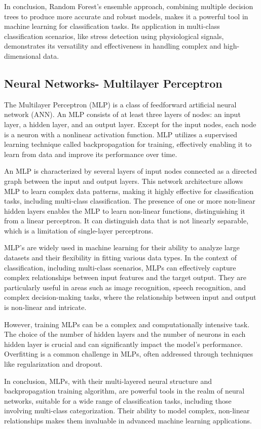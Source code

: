 In conclusion, Random Forest's ensemble approach, combining multiple decision trees to produce more accurate and robust models, makes it a powerful tool in machine learning for classification tasks. Its application in multi-class classification scenarios, like stress detection using physiological signals, demonstrates its versatility and effectiveness in handling complex and high-dimensional data.

\subsection*{Neural Networks- Multilayer Perceptron}

The Multilayer Perceptron (MLP) is a class of feedforward artificial neural network (ANN). An MLP consists of at least three layers of nodes: an input layer, a hidden layer, and an output layer. Except for the input nodes, each node is a neuron with a nonlinear activation function. MLP utilizes a supervised learning technique called backpropagation for training, effectively enabling it to learn from data and improve its performance over time.

An MLP is characterized by several layers of input nodes connected as a directed graph between the input and output layers. This network architecture allows MLP to learn complex data patterns, making it highly effective for classification tasks, including multi-class classification. The presence of one or more non-linear hidden layers enables the MLP to learn non-linear functions, distinguishing it from a linear perceptron. It can distinguish data that is not linearly separable, which is a limitation of single-layer perceptrons.

MLP's are widely used in machine learning for their ability to analyze large datasets and their flexibility in fitting various data types. In the context of classification, including multi-class scenarios, MLPs can effectively capture complex relationships between input features and the target output. They are particularly useful in areas such as image recognition, speech recognition, and complex decision-making tasks, where the relationship between input and output is non-linear and intricate.

However, training MLPs can be a complex and computationally intensive task. The choice of the number of hidden layers and the number of neurons in each hidden layer is crucial and can significantly impact the model's performance. Overfitting is a common challenge in MLPs, often addressed through techniques like regularization and dropout.

In conclusion, MLPs, with their multi-layered neural structure and backpropagation training algorithm, are powerful tools in the realm of neural networks, suitable for a wide range of classification tasks, including those involving multi-class categorization. Their ability to model complex, non-linear relationships makes them invaluable in advanced machine learning applications.

